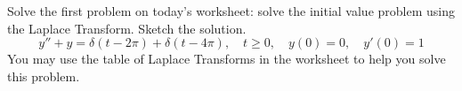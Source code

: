 \documentclass[12pt]{exam}
\begin{document}
    


\newpage


\begin{questions}


    \question[4]  Solve the first problem on today's worksheet: solve the initial value problem using the Laplace Transform. Sketch the solution. $$ y'' + y = \delta(t-2\pi)+\delta(t-4\pi), \quad t \ge 0, \quad y(0) = 0, \quad y'(0) = 1 $$
    You may use the table of Laplace Transforms in the worksheet to help you solve this problem. 

\end{questions}
\end{document}
